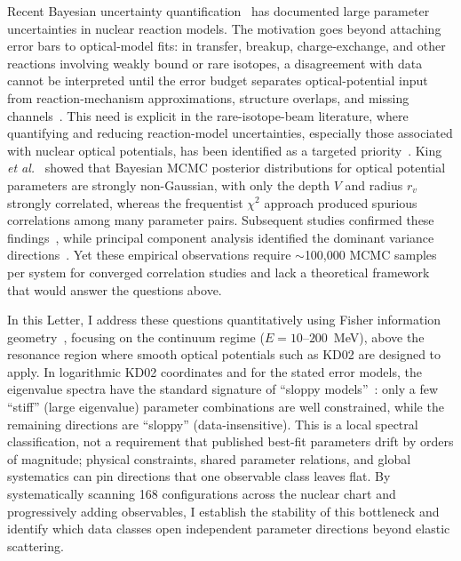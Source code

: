 \documentclass[aps,prl,reprint,superscriptaddress,showpacs,floatfix]{revtex4-2}
\begin{document}
Recent Bayesian uncertainty quantification~\cite{Furnstahl2015,Phillips2021} has documented large parameter uncertainties in nuclear reaction models. The motivation goes beyond attaching error bars to optical-model fits: in transfer, breakup, charge-exchange, and other reactions involving weakly bound or rare isotopes, a disagreement with data cannot be interpreted until the error budget separates optical-potential input from reaction-mechanism approximations, structure overlaps, and missing channels~\cite{King2018,Lovell2021}. This need is explicit in the rare-isotope-beam literature, where quantifying and reducing reaction-model uncertainties, especially those associated with nuclear optical potentials, has been identified as a targeted priority~\cite{Hebborn2023}. King \textit{et al.}~\cite{King2019PRL} showed that Bayesian MCMC posterior distributions for optical potential parameters are strongly non-Gaussian, with only the depth $V$ and radius $r_v$ strongly correlated, whereas the frequentist $\chi^2$ approach produced spurious correlations among many parameter pairs. Subsequent studies confirmed these findings~\cite{King2018,Lovell2021,Catacora2019}, while principal component analysis identified the dominant variance directions~\cite{Catacora2021}. Yet these empirical observations require $\sim$100,000 MCMC samples per system for converged correlation studies and lack a theoretical framework that would answer the questions above.

In this Letter, I address these questions quantitatively using Fisher information geometry~\cite{Fisher1925}, focusing on the continuum regime ($E = 10$--$200$~MeV), above the resonance region where smooth optical potentials such as KD02 are designed to apply. In logarithmic KD02 coordinates and for the stated error models, the eigenvalue spectra have the standard signature of ``sloppy models''~\cite{Waterfall2006PRL,Gutenkunst2007,Machta2013,Transtrum2015,Niksic2016}: only a few ``stiff'' (large eigenvalue) parameter combinations are well constrained, while the remaining directions are ``sloppy'' (data-insensitive). This is a local spectral classification, not a requirement that published best-fit parameters drift by orders of magnitude; physical constraints, shared parameter relations, and global systematics can pin directions that one observable class leaves flat. By systematically scanning 168 configurations across the nuclear chart and progressively adding observables, I establish the stability of this bottleneck and identify which data classes open independent parameter directions beyond elastic scattering.
\end{document}
